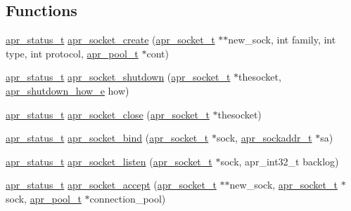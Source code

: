 \subsection*{Functions}
\begin{DoxyCompactItemize}
\item 
\hyperlink{group__apr__errno_gaf76ee4543247e9fb3f3546203e590a6c}{apr\-\_\-status\-\_\-t} \hyperlink{group__apr__network__io_ga46b81e267ef80e64510d4e83880a91bd}{apr\-\_\-socket\-\_\-create} (\hyperlink{group__apr__network__io_ga49262b223e7434746e1f1737659aa2c3}{apr\-\_\-socket\-\_\-t} $\ast$$\ast$new\-\_\-sock, int family, int type, int protocol, \hyperlink{group__apr__pools_gaf137f28edcf9a086cd6bc36c20d7cdfb}{apr\-\_\-pool\-\_\-t} $\ast$cont)
\item 
\hyperlink{group__apr__errno_gaf76ee4543247e9fb3f3546203e590a6c}{apr\-\_\-status\-\_\-t} \hyperlink{group__apr__network__io_gac5aea857a50c493f840c48b930abc48e}{apr\-\_\-socket\-\_\-shutdown} (\hyperlink{group__apr__network__io_ga49262b223e7434746e1f1737659aa2c3}{apr\-\_\-socket\-\_\-t} $\ast$thesocket, \hyperlink{group__apr__network__io_gae2130f1fa2d0db58c5c3c9c73d9b4009}{apr\-\_\-shutdown\-\_\-how\-\_\-e} how)
\item 
\hyperlink{group__apr__errno_gaf76ee4543247e9fb3f3546203e590a6c}{apr\-\_\-status\-\_\-t} \hyperlink{group__apr__network__io_ga88779f243ce19a2563544aee81894e6d}{apr\-\_\-socket\-\_\-close} (\hyperlink{group__apr__network__io_ga49262b223e7434746e1f1737659aa2c3}{apr\-\_\-socket\-\_\-t} $\ast$thesocket)
\item 
\hyperlink{group__apr__errno_gaf76ee4543247e9fb3f3546203e590a6c}{apr\-\_\-status\-\_\-t} \hyperlink{group__apr__network__io_ga512882c9979c2b9cad7cbc2508516d65}{apr\-\_\-socket\-\_\-bind} (\hyperlink{group__apr__network__io_ga49262b223e7434746e1f1737659aa2c3}{apr\-\_\-socket\-\_\-t} $\ast$sock, \hyperlink{structapr__sockaddr__t}{apr\-\_\-sockaddr\-\_\-t} $\ast$sa)
\item 
\hyperlink{group__apr__errno_gaf76ee4543247e9fb3f3546203e590a6c}{apr\-\_\-status\-\_\-t} \hyperlink{group__apr__network__io_ga154bcee918f6f01fe0373359dd74b0c4}{apr\-\_\-socket\-\_\-listen} (\hyperlink{group__apr__network__io_ga49262b223e7434746e1f1737659aa2c3}{apr\-\_\-socket\-\_\-t} $\ast$sock, apr\-\_\-int32\-\_\-t backlog)
\item 
\hyperlink{group__apr__errno_gaf76ee4543247e9fb3f3546203e590a6c}{apr\-\_\-status\-\_\-t} \hyperlink{group__apr__network__io_ga1d62711ca77ccc0f6413a298a47876da}{apr\-\_\-socket\-\_\-accept} (\hyperlink{group__apr__network__io_ga49262b223e7434746e1f1737659aa2c3}{apr\-\_\-socket\-\_\-t} $\ast$$\ast$new\-\_\-sock, \hyperlink{group__apr__network__io_ga49262b223e7434746e1f1737659aa2c3}{apr\-\_\-socket\-\_\-t} $\ast$sock, \hyperlink{group__apr__pools_gaf137f28edcf9a086cd6bc36c20d7cdfb}{apr\-\_\-pool\-\_\-t} $\ast$connection\-\_\-pool)

\end{DoxyCompactItemize}
